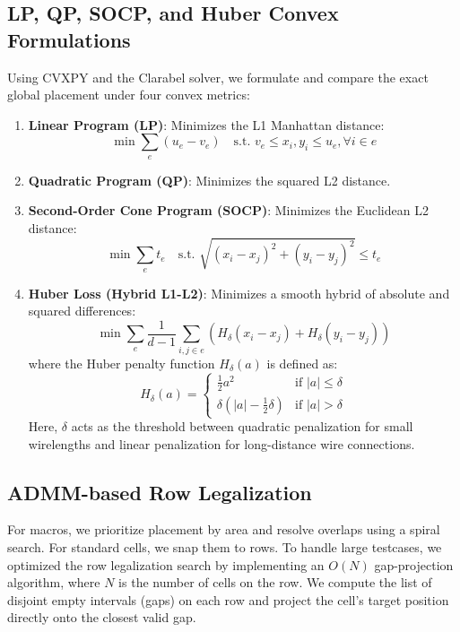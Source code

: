 \documentclass[10pt, twocolumn]{article}
\begin{document}
\subsection{LP, QP, SOCP, and Huber Convex Formulations}
Using CVXPY and the Clarabel solver, we formulate and compare the exact global placement under four convex metrics:
\begin{enumerate}
\item \textbf{Linear Program (LP)}: Minimizes the L1 Manhattan distance:
\begin{equation}
\min \sum_{e} (u_e - v_e) \quad \text{s.t. } v_e \le x_i, y_i \le u_e, \forall i \in e
\end{equation}
\item \textbf{Quadratic Program (QP)}: Minimizes the squared L2 distance.
\item \textbf{Second-Order Cone Program (SOCP)}: Minimizes the Euclidean L2 distance:
\begin{equation}
\min \sum_{e} t_e \quad \text{s.t. } \sqrt{(x_i - x_j)^2 + (y_i - y_j)^2} \le t_e
\end{equation}
\item \textbf{Huber Loss (Hybrid L1-L2)}: Minimizes a smooth hybrid of absolute and squared differences:
\begin{equation}
\min \sum_{e} \frac{1}{d-1} \sum_{i, j \in e} \left( H_{\delta}(x_i - x_j) + H_{\delta}(y_i - y_j) \right)
\end{equation}
where the Huber penalty function $H_{\delta}(a)$ is defined as:
\begin{equation}
H_{\delta}(a) = \begin{cases} \frac{1}{2} a^2 & \text{if } |a| \le \delta \\ \delta(|a| - \frac{1}{2} \delta) & \text{if } |a| > \delta \end{cases}
\end{equation}
Here, $\delta$ acts as the threshold between quadratic penalization for small wirelengths and linear penalization for long-distance wire connections.
\end{enumerate}

\subsection{ADMM-based Row Legalization}
For macros, we prioritize placement by area and resolve overlaps using a spiral search. For standard cells, we snap them to rows. To handle large testcases, we optimized the row legalization search by implementing an $O(N)$ gap-projection algorithm, where $N$ is the number of cells on the row. We compute the list of disjoint empty intervals (gaps) on each row and project the cell's target position directly onto the closest valid gap.
\end{document}
